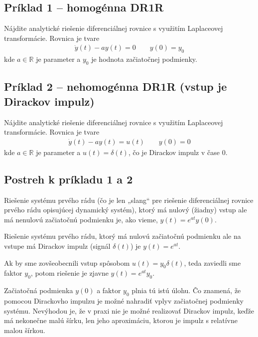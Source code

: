 \documentclass[a4paper, 10pt, ]{article}
\begin{document}
\subsection{Príklad 1 --  homogénna DR1R}

Nájdite analytické riešenie diferenciálnej rovnice s využitím Laplaceovej transformácie. Rovnica je tvare
\begin{align}
    \dot y(t) - a y(t) = 0 \qquad y(0) = y_0
\end{align}
kde $a \in \mathbb R$ je parameter a $y_0$ je hodnota začiatočnej podmienky. 




\subsection{Príklad 2 --  nehomogénna DR1R (vstup je Dirackov impulz)}
\label{s1pr2}

Nájdite analytické riešenie diferenciálnej rovnice s využitím Laplaceovej transformácie. Rovnica je tvare
\begin{align}
    \dot y(t) - a y(t) = u(t) \qquad y(0) = 0
\end{align}
kde $a \in \mathbb R$ je parameter a $u(t) = \delta(t)$, čo je Dirackov impulz v čase $0$.



\subsection{Postreh k príkladu 1 a 2}

Riešenie systému prvého rádu (čo je len „slang“ pre riešenie diferenciálnej rovnice prvého rádu opisujúcej dynamický systém), ktorý má nulový (žiadny) vstup ale má nenulovú začiatočnú podmienku je, ako vieme, $y(t) = e^{at} y(0)$.

Riešenie systému prvého rádu, ktorý má nulovú začiatočnú podmienku ale na vstupe má Dirackov impulz (signál $\delta(t)$) je $y(t) = e^{at}$.

Ak by sme zovšeobecnili vstup spôsobom $u(t) = y_0 \delta(t)$, teda zaviedli sme faktor $y_0$, potom riešenie je zjavne $y(t) = e^{at} y_0 $. 

Začiatočná podmienka $y(0)$ a faktor $y_0$ plnia tú istú úlohu. Čo znamená, že pomocou Dirackovho impulzu je možné nahradiť vplyv začiatočnej podmienky systému. Nevýhodou je, že v praxi nie je možné realizovať Dirackov impulz, keďže má nekonečne malú šírku, len jeho aproximáciu, ktorou je impulz s relatívne malou šírkou.
\end{document}
